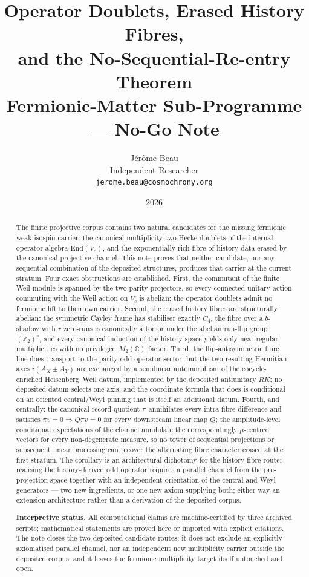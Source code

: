 \documentclass[11pt,a4paper]{article}
\title{\textbf{Operator Doublets, Erased History Fibres,}\\
\textbf{and the No-Sequential-Re-entry Theorem}\\[0.5em]
\large Fermionic-Matter Sub-Programme --- No-Go Note}
\author{J\'er\^ome Beau\\[0.3em]
\small Independent Researcher\\
\small \texttt{jerome.beau@cosmochrony.org}}
\date{2026}
\theoremstyle{definition}
\theoremstyle{remark}
\newcommand{\C}{\mathbb{C}}
\newcommand{\End}{\mathrm{End}}
\newcommand{\Vc}{V_{c}}
\newcommand{\AX}{A_{X}}
\newcommand{\AY}{A_{Y}}
\begin{document}
\maketitle

\begin{abstract}
The finite projective corpus contains two natural candidates for the missing fermionic
weak-isospin carrier: the canonical multiplicity-two Hecke doublets of the internal
operator algebra $\End(\Vc)$, and the exponentially rich fibre of history data erased by
the canonical projective channel.
This note proves that neither candidate, nor any sequential combination of the deposited
structures, produces that carrier at the current stratum.
Four exact obstructions are established.
First, the commutant of the finite Weil module is spanned by the two parity projectors,
so every connected unitary action commuting with the Weil action on $\Vc$ is abelian: the
operator doublets admit no fermionic lift to their own carrier.
Second, the erased history fibres are structurally abelian: the symmetric Cayley frame
has stabiliser exactly $C_4$, the fibre over a $b$-shadow with $r$ zero-runs is
canonically a torsor under the abelian run-flip group $(\mathbb{Z}_2)^r$, and every
canonical induction of the history space yields only near-regular multiplicities with no
privileged $M_2(\C)$ factor.
Third, the flip-antisymmetric fibre line does transport to the parity-odd operator sector,
but the two resulting Hermitian axes $i(\AX\pm\AY)$ are exchanged by a semilinear
automorphism of the cocycle-enriched Heisenberg--Weil datum, implemented by the deposited
antiunitary $RK$; no deposited datum selects one axis, and the coordinate formula that
does is conditional on an oriented central/Weyl pinning that is itself an additional datum.
Fourth, and centrally: the canonical record quotient $\pi$ annihilates every intra-fibre
difference and satisfies $\pi v=0\Rightarrow Q\pi v=0$ for every downstream linear map
$Q$; the amplitude-level conditional expectations of the channel annihilate the
correspondingly $\mu$-centred vectors for every non-degenerate measure, so no tower of
sequential projections or subsequent linear processing can recover the alternating fibre
character erased at the first stratum.
The corollary is an architectural dichotomy for the history-fibre route: realising the
history-derived odd operator requires a parallel channel from the pre-projection space
together with an independent orientation of the central and Weyl generators --- two new
ingredients, or one new axiom supplying both; either way an extension architecture
rather than a derivation of the deposited corpus.

\noindent\textbf{Interpretive status.}
All computational claims are machine-certified by three archived scripts; mathematical
statements are proved here or imported with explicit citations.
The note closes the two deposited candidate routes; it does not exclude an explicitly
axiomatised parallel channel, nor an independent new multiplicity carrier outside the
deposited corpus, and it leaves the fermionic multiplicity target itself untouched and
open.
\end{abstract}
\end{document}
